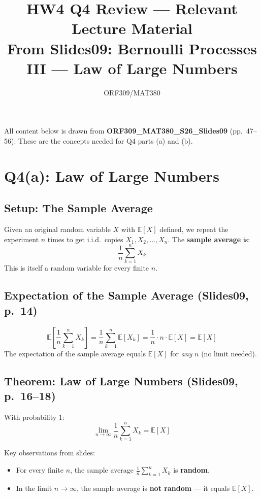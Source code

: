 \documentclass[11pt]{article}
\title{HW4 Q4 Review --- Relevant Lecture Material\\[4pt]
\large From Slides09: Bernoulli Processes III --- Law of Large Numbers}
\author{ORF309/MAT380}
\date{}
\newcommand{\E}{\mathbb{E}}
\begin{document}
\maketitle

\noindent All content below is drawn from \textbf{ORF309\_MAT380\_S26\_Slides09} (pp.\ 47--56). These are the concepts needed for Q4 parts (a) and (b).

\section*{Q4(a): Law of Large Numbers}

\subsection*{Setup: The Sample Average}

Given an original random variable $X$ with $\E[X]$ defined, we repeat the experiment $n$ times to get i.i.d.\ copies $X_1, X_2, \ldots, X_n$. The \textbf{sample average} is:
\[
\frac{1}{n}\sum_{k=1}^{n} X_k
\]
This is itself a random variable for every finite $n$.

\subsection*{Expectation of the Sample Average (Slides09, p.\ 14)}

\[
\E\!\left[\frac{1}{n}\sum_{k=1}^{n} X_k\right] = \frac{1}{n}\sum_{k=1}^{n}\E[X_k] = \frac{1}{n}\cdot n\cdot \E[X] = \E[X]
\]
The expectation of the sample average equals $\E[X]$ for \emph{any} $n$ (no limit needed).

\subsection*{Theorem: Law of Large Numbers (Slides09, p.\ 16--18)}

\begin{tcolorbox}[colback=blue!5, colframe=blue!50!black, title=Law of Large Numbers for Random Variables]
With probability 1:
\[
\lim_{n\to\infty} \frac{1}{n}\sum_{k=1}^{n} X_k = \E[X]
\]
\end{tcolorbox}

\noindent Key observations from slides:
\begin{itemize}[nosep]
    \item For every finite $n$, the sample average $\frac{1}{n}\sum_{k=1}^n X_k$ is \textbf{random}.
    \item In the limit $n\to\infty$, the sample average is \textbf{not random} --- it equals $\E[X]$.
\end{itemize}
\end{document}
